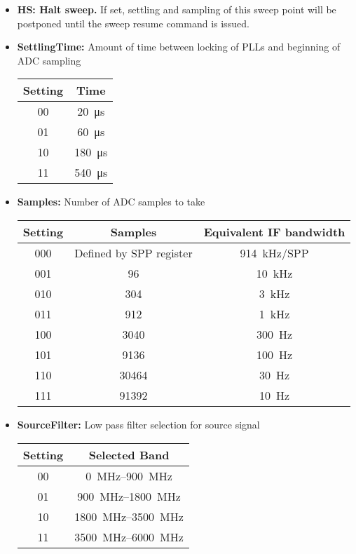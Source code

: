 \documentclass{article}
\begin{document}
\begin{itemize}
\item \textbf{HS: Halt sweep.} If set, settling and sampling of this sweep point will be postponed until the sweep resume command is issued.
\item \textbf{SettlingTime:} Amount of time between locking of PLLs and beginning of ADC sampling
\begin{center}
\begin{tabular}{ c|c }
Setting & Time\\
 \hline
00 & \SI{20}{\micro\second}\\
01 & \SI{60}{\micro\second}\\
10 & \SI{180}{\micro\second}\\
11 & \SI{540}{\micro\second}\\
\end{tabular}
\end{center}
\item \textbf{Samples:} Number of ADC samples to take
\begin{center}
\begin{tabular}{ c|c|c }
Setting & Samples & Equivalent IF bandwidth\\
 \hline
000 & Defined by SPP register & \SI{914}{\kilo\hertz}/SPP\\
001 & 96 & \SI{10}{\kilo\hertz}\\
010 & 304 & \SI{3}{\kilo\hertz}\\
011 & 912 & \SI{1}{\kilo\hertz}\\
100 & 3040 & \SI{300}{\hertz}\\
101 & 9136 & \SI{100}{\hertz}\\
110 & 30464 & \SI{30}{\hertz}\\
111 & 91392 & \SI{10}{\hertz}\\
\end{tabular}
\end{center}
\item \textbf{SourceFilter:} Low pass filter selection for source signal
\begin{center}
\begin{tabular}{ c|c }
Setting & Selected Band\\
 \hline
00 & \SIrange{0}{900}{\mega\hertz}\\
01 & \SIrange{900}{1800}{\mega\hertz}\\
10 & \SIrange{1800}{3500}{\mega\hertz}\\
11 & \SIrange{3500}{6000}{\mega\hertz}\\
\end{tabular}

\end{center}
\end{itemize}
\end{document}
